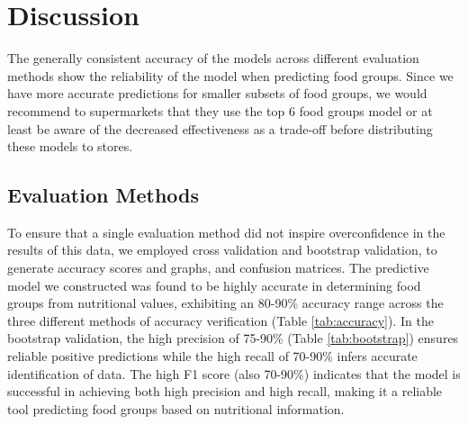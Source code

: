 \documentclass[11pt]{article}
\begin{document}
\section{Discussion}



The generally consistent accuracy of the models across different evaluation methods show the reliability of the model when predicting food groups. Since we have more accurate predictions for smaller subsets of food groups, we would recommend to supermarkets that they use the top 6 food groups model or at least be aware of the decreased effectiveness as a trade-off before distributing these models to stores.

\subsection{Evaluation Methods}
To ensure that a single evaluation method did not inspire overconfidence in the results of this data, we employed cross validation and bootstrap validation, to generate accuracy scores and graphs, and confusion matrices. The predictive model we constructed was found to be highly accurate in determining food groups from nutritional values, exhibiting an 80-90\% accuracy range across the three different methods of accuracy verification (Table \ref{tab:accuracy}).
In the bootstrap validation, the high precision of 75-90\% (Table \ref{tab:bootstrap}) ensures reliable positive predictions while the high recall of 70-90\% infers accurate identification of data. The high F1 score (also 70-90\%) indicates that the model is successful in achieving both high precision and high recall, making it a reliable tool predicting food groups based on nutritional information.
\end{document}
